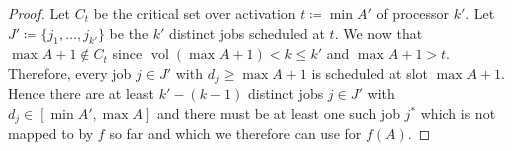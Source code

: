 \documentclass[a4paper]{article}
\DeclareMathOperator{\vol}{vol}
\begin{document}
\begin{proof}
  Let $C_t$ be the critical set over activation $t \coloneqq \min A'$ of processor $k'$.
  Let $J' \coloneqq \{ j_1, \ldots, j_{k'} \}$ be the $k'$ distinct jobs scheduled at $t$.
  We now that $\max A + 1 \notin C_t$ since $\vol(\max A + 1) < k \leq k'$ and $\max A + 1 > t$.
  Therefore, every job $j \in J'$ with $d_j \geq \max A + 1$ is scheduled at slot $\max A + 1$.
  Hence there are at least $k' - (k-1)$ distinct jobs $j \in J'$ with $d_j \in [\min A', \max A]$ and there must be at least one such job $j^*$ which is not mapped to by $f$ so far and which we therefore can use for $f(A)$.
\end{proof}
%


\end{document}
